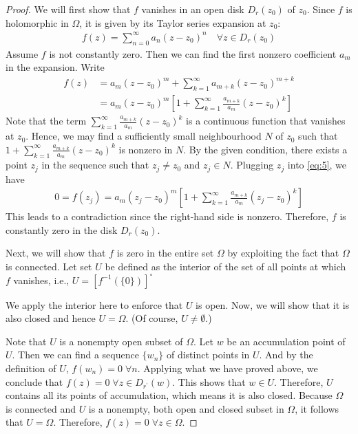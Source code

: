 \documentclass[thmcnt=section, color=cyan, 12pt]{my-elegantbook}
\begin{document}
\begin{proof}
	We will first show that $f$ vanishes in an open disk $D_r(z_0)$ of $z_0$.
	Since $f$ is holomorphic in $\Omega$, it is given by its Taylor series expansion at $z_0$:
	\begin{align*}
		f(z) = \sum_{n=0}^\infty a_n  (z - z_0)^n \quad \forall z \in D_r(z_0)
	\end{align*}
	Assume $f$ is not constantly zero.
	Then we can find the first nonzero coefficient $a_m$ in the expansion.
	Write
	\begin{align}
		f(z) & = a_m(z - z_0)^m + \sum_{k=1}^\infty a_{m+k}  (z - z_0)^{m+k} \nonumber \\
		     & = a_m(z - z_0)^m \left[
			1 + \sum_{k=1}^\infty \frac{a_{m+k}}{a_m}  (z - z_0)^{k}
			\right]
		\label{eq:5}
	\end{align}
	Note that the term $\sum_{k=1}^\infty \frac{a_{m+k}}{a_m}  (z - z_0)^{k}$ is a continuous function that vanishes at $z_0$.
	Hence, we may find a sufficiently small neighbourhood $N$ of $z_0$ such that $1 + \sum_{k=1}^\infty \frac{a_{m+k}}{a_m}  (z - z_0)^{k}$ is nonzero in $N$.
	By the given condition, there exists a point $z_j$ in the sequence such that $z_j \neq z_0$ and $z_j \in N$.
	Plugging $z_j$ into \eqref{eq:5}, we have
	\begin{align*}
		0 = f(z_j) = a_m(z_j - z_0)^m \left[
			1 + \sum_{k=1}^\infty \frac{a_{m+k}}{a_m}  (z_j - z_0)^{k}
			\right]
	\end{align*}
	This leads to a contradiction since the right-hand side is nonzero.
	Therefore, $f$ is constantly zero in the disk $D_r(z_0)$.

	Next, we will show that $f$ is zero in the entire set $\Omega$ by exploiting the fact that $\Omega$ is connected.
	Let set $U$ be defined as the interior of the set of all points at which $f$ vanishes, i.e., $U = [f^{-1}(\{0\})]^\circ$
	\begin{note}
		We apply the interior here to enforce that $U$ is open. Now, we will show that it is also closed and hence $U = \Omega$. (Of course, $U \neq \emptyset$.)
	\end{note}

	Note that $U$ is a nonempty open subset of $\Omega$.
	Let $w$ be an accumulation point of $U$.
	Then we can find a sequence $\{w_n\}$ of distinct points in $U$.
	And by the definition of $U$, $f(w_n) = 0 \; \forall n$.
	Applying what we have proved above, we conclude that $f(z) = 0 \; \forall z \in D_{r^\prime} (w)$.
	This shows that $w \in U$.
	Therefore, $U$ contains all its points of accumulation, which means it is also closed.
	Because $\Omega$ is connected and $U$ is a nonempty, both open and closed subset in $\Omega$, it follows that $U = \Omega$.
	Therefore, $f(z) = 0 \; \forall z \in \Omega$.
\end{proof}




\printbibliography[heading=bibintoc, title=References]


\printindex
\end{document}
